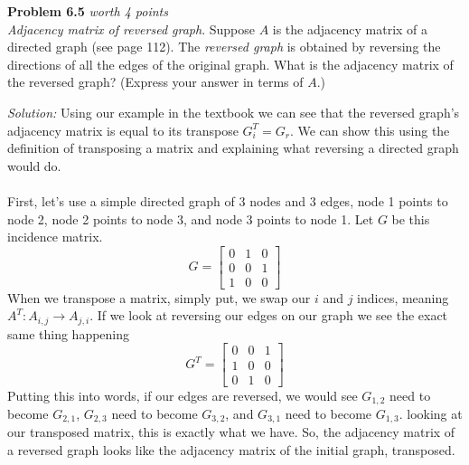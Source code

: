 \documentclass{article}
\newenvironment{problem}[3][Problem]
    { \begin{mdframed}[backgroundcolor=gray!20] \textbf{#1 #2} \textit{worth #3 points} \\}
    {  \end{mdframed}}
\newenvironment{solution}
    {\textit{Solution:}}
    {}
\begin{document}
\begin{problem}{6.5}{4}
\textit{Adjacency matrix of reversed graph}. Suppose $A$ is the adjacency matrix of a directed graph (see page {\color{red} 112}). The \textit{reversed graph} is obtained by reversing the directions of all the edges of the original graph. What is the adjacency matrix of the reversed graph? (Express your answer in terms of $A$.)
\end{problem}
\begin{solution}
Using our example in the textbook we can see that the reversed graph's adjacency matrix is equal to its transpose $G_i^T=G_r$. We can show this using the definition of transposing a matrix and explaining what reversing a directed graph would do. \\
\\
First, let's use a simple directed graph of 3 nodes and 3 edges, node 1 points to node 2, node 2 points to node 3, and node 3 points to node 1. Let $G$ be this incidence matrix.
$$G =\begin{bmatrix}
    0 &1 &0 \\
    0 &0 &1 \\
    1 &0 &0
\end{bmatrix}$$
When we transpose a matrix, simply put, we swap our $i$ and $j$ indices, meaning $A^T: A_{i,j} \longrightarrow A_{j,i}$. If we look at reversing our edges on our graph we see the exact same thing happening
$$G^T =\begin{bmatrix}
    0 &0 &1 \\
    1 &0 &0 \\
    0 &1 &0
\end{bmatrix}$$
Putting this into words, if our edges are reversed, we would see $G_{1,2}$ need to become $G_{2,1}$, $G_{2,3}$ need to become $G_{3,2}$, and $G_{3,1}$ need to become $G_{1,3}$. looking at our transposed matrix, this is exactly what we have. {\color{olive}So, the adjacency matrix of a reversed graph looks like the adjacency matrix of the initial graph, transposed.}
\end{solution}
\end{document}

